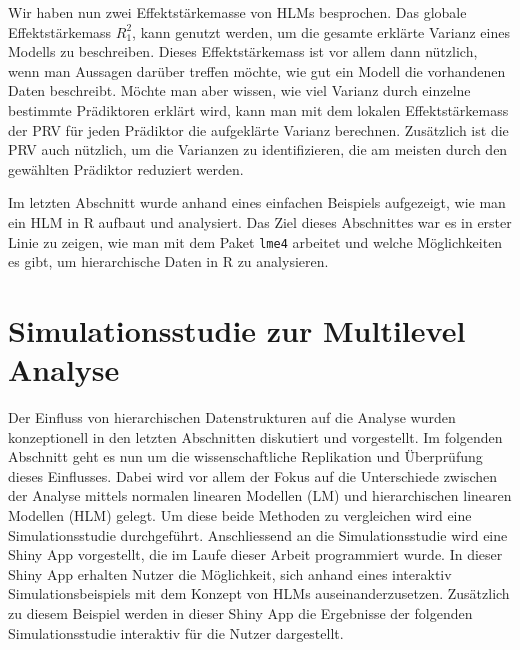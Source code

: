 \documentclass[12pt]{article}\usepackage[]{graphicx}\usepackage[]{color}
\begin{document}
Wir haben nun zwei Effektstärkemasse von HLMs besprochen. Das globale Effektstärkemass $R_{1}^2$, kann genutzt werden, um die gesamte erklärte Varianz eines Modells zu beschreiben. Dieses Effektstärkemass ist vor allem dann nützlich, wenn man Aussagen darüber treffen möchte, wie gut ein Modell die vorhandenen Daten beschreibt. Möchte man aber wissen, wie viel Varianz durch einzelne bestimmte Prädiktoren erklärt wird, kann man mit dem lokalen Effektstärkemass der PRV für jeden Prädiktor die aufgeklärte Varianz berechnen. Zusätzlich ist die PRV auch nützlich, um die Varianzen zu identifizieren, die am meisten durch den gewählten Prädiktor reduziert werden.

Im letzten Abschnitt wurde anhand eines einfachen Beispiels aufgezeigt, wie man ein HLM in R aufbaut und analysiert. Das Ziel dieses Abschnittes war es in erster Linie zu zeigen, wie man mit dem Paket \texttt{lme4} arbeitet und welche Möglichkeiten es gibt, um hierarchische Daten in R zu analysieren.

\section{Simulationsstudie zur Multilevel Analyse}
Der Einfluss von hierarchischen Datenstrukturen auf die Analyse wurden konzeptionell in den letzten Abschnitten diskutiert und vorgestellt. Im folgenden Abschnitt geht es nun um die wissenschaftliche Replikation und Überprüfung dieses Einflusses. Dabei wird vor allem der Fokus auf die Unterschiede zwischen der Analyse mittels normalen linearen Modellen (LM) und hierarchischen linearen Modellen (HLM) gelegt. Um diese beide Methoden zu vergleichen wird eine Simulationsstudie durchgeführt. Anschliessend an die Simulationsstudie wird eine Shiny App \citep{shiny} vorgestellt, die im Laufe dieser Arbeit programmiert wurde. In dieser Shiny App erhalten Nutzer die Möglichkeit, sich anhand eines interaktiv Simulationsbeispiels mit dem Konzept von HLMs auseinanderzusetzen. Zusätzlich zu diesem Beispiel werden in dieser Shiny App die Ergebnisse der folgenden Simulationsstudie interaktiv für die Nutzer dargestellt.
\end{document}
